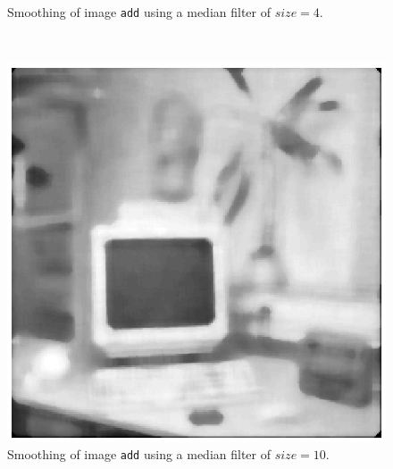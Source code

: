 \begin{minipage}{\linewidth}
\begin{minipage}{0.4\linewidth}
\begin{figure}[H]
      \caption{Smoothing of image \texttt{add} using a median filter of $size=4$.}
      \label{fig:Q17_medfilt_add_4}
    \end{figure}
  \end{minipage}
\end{minipage}
\\

\begin{minipage}{\linewidth}
  \begin{minipage}{0.4\linewidth}
    \begin{figure}[H]
      \includegraphics[scale=0.6]{./images/Q17/medfilt/add_10.eps}
      \caption{Smoothing of image \texttt{add} using a median filter of $size=10$.}
      \label{fig:Q17_medfilt_add_10}
    \end{figure}
  \end{minipage}
  \hspace{0.05\linewidth}
  \begin{minipage}{0.4\linewidth}
    \begin{figure}[H]

\end{figure}
\end{minipage}
\end{minipage}
